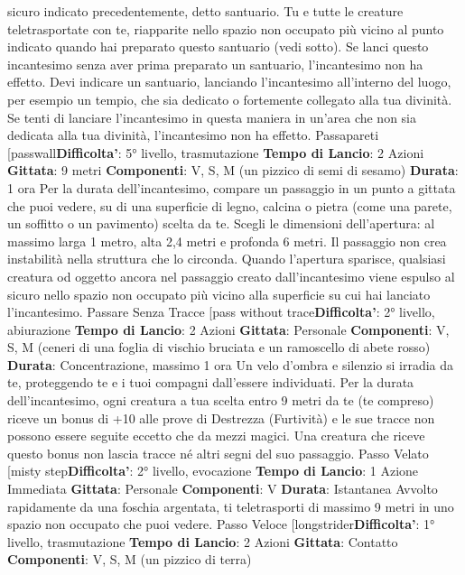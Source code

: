 \begin{multicols}{2}
sicuro indicato precedentemente, detto santuario. Tu e
tutte le creature teletrasportate con te, riapparite nello
spazio non occupato più vicino al punto indicato quando
hai preparato questo santuario (vedi sotto). Se lanci
questo incantesimo senza aver prima preparato un
santuario, l’incantesimo non ha effetto.
Devi indicare un santuario, lanciando l’incantesimo
all’interno del luogo, per esempio un tempio, che sia
dedicato o fortemente collegato alla tua divinità. Se tenti
di lanciare l’incantesimo in questa maniera in un’area
che non sia dedicata alla tua divinità, l’incantesimo non
ha effetto.
Passapareti
[passwall\textbf{Difficolta'}:
5° livello, trasmutazione
\textbf{Tempo di Lancio}: 2 Azioni
\textbf{Gittata}: 9 metri
\textbf{Componenti}: V, S, M (un pizzico di semi di sesamo)
\textbf{Durata}: 1 ora
Per la durata dell’incantesimo, compare un passaggio
in un punto a gittata che puoi vedere, su di una
superficie di legno, calcina o pietra (come una parete,
un soffitto o un pavimento) scelta da te. Scegli le
dimensioni dell’apertura: al massimo larga 1 metro, 
alta 2,4 metri e profonda 6 metri. Il passaggio non crea
instabilità nella struttura che lo circonda.
Quando l’apertura sparisce, qualsiasi creatura od
oggetto ancora nel passaggio creato dall’incantesimo
viene espulso al sicuro nello spazio non occupato più
vicino alla superficie su cui hai lanciato l’incantesimo.
Passare Senza Tracce
[pass without trace\textbf{Difficolta'}:
2° livello, abiurazione
\textbf{Tempo di Lancio}: 2 Azioni
\textbf{Gittata}: Personale
\textbf{Componenti}: V, S, M (ceneri di una foglia di vischio
bruciata e un ramoscello di abete rosso)
\textbf{Durata}: Concentrazione, massimo 1 ora
Un velo d’ombra e silenzio si irradia da te, proteggendo
te e i tuoi compagni dall’essere individuati. Per la durata
dell’incantesimo, ogni creatura a tua scelta entro 9 metri
da te (te compreso) riceve un bonus di +10 alle prove di
Destrezza (Furtività) e le sue tracce non possono
essere seguite eccetto che da mezzi magici. Una
creatura che riceve questo bonus non lascia tracce né
altri segni del suo passaggio.
Passo Velato
[misty step\textbf{Difficolta'}:
2° livello, evocazione
\textbf{Tempo di Lancio}: 1 Azione Immediata
\textbf{Gittata}: Personale
\textbf{Componenti}: V
\textbf{Durata}: Istantanea
Avvolto rapidamente da una foschia argentata, ti
teletrasporti di massimo 9 metri in uno spazio non
occupato che puoi vedere.
Passo Veloce
[longstrider\textbf{Difficolta'}:
1° livello, trasmutazione
\textbf{Tempo di Lancio}: 2 Azioni
\textbf{Gittata}: Contatto
\textbf{Componenti}: V, S, M (un pizzico di terra)

\end{multicols}
